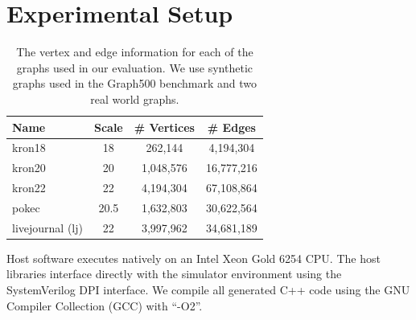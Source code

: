 %


\section{Experimental Setup}

\begin{table}[]
    \centering
    \begin{tabular}{lccc}
    \toprule
     \textbf{Name} & \textbf{Scale} & \textbf{\# Vertices} & \textbf{\# Edges} \\ \midrule %
     kron18 & 18 & 262,144 & 4,194,304 \\ %
     kron20 & 20 & 1,048,576 & 16,777,216 \\ %
     kron22 & 22 & 4,194,304 & 67,108,864 \\ %
     pokec & 20.5 & 1,632,803 & 30,622,564 \\ %
     livejournal (lj) & 22 & 3,997,962 & 34,681,189 \\ %
     \bottomrule
    \end{tabular}
    
    \caption{The vertex and edge information for each of the graphs used in our evaluation. We use synthetic \kron graphs used in the Graph500 benchmark and two real world graphs.}
    \label{sec:eval:tab:graphs}
\end{table}

Host software executes natively on an Intel Xeon Gold 6254 CPU.
The host libraries interface directly with the simulator environment using the SystemVerilog DPI interface.
We compile all generated C++ code using the GNU Compiler Collection (GCC) with ``-O2''.

